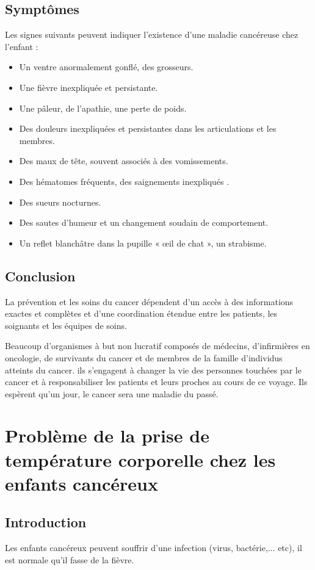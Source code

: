 \documentclass[12pt]{article}
\begin{document}
\subsection{Symptômes}
Les signes suivants peuvent indiquer l’existence d’une maladie cancéreuse chez l’enfant \cite{34}:
\begin{itemize}
	\item Un ventre anormalement gonflé, des grosseurs.  
	\item Une fièvre inexpliquée et persistante. 
	\item Une pâleur, de l’apathie, une perte de poids. 
	\item Des douleurs inexpliquées et persistantes dans les articulations et les membres.
	\item Des maux de tête, souvent associés à des vomissements. 
	\item Des hématomes fréquents, des saignements inexpliqués . 
	\item Des sueurs nocturnes. 
	\item Des sautes d’humeur et un changement soudain de comportement. 
	\item Un reflet blanchâtre dans la pupille « œil de chat », un strabisme.
\end{itemize}

\subsection{Conclusion}
La prévention et les soins du cancer dépendent d'un accès à des informations exactes et complètes et d'une coordination étendue entre les patients, les soignants et les équipes de soins.

Beaucoup d'organismes à but non lucratif composés de médecins, d'infirmières en oncologie, de survivants du cancer et de membres de la famille d'individus atteints du cancer. ils s'engagent à changer la vie des personnes touchées par le cancer et à responsabiliser les patients et leurs proches au cours de ce voyage. Ils espèrent qu'un jour, le cancer sera une maladie du passé.

\section{Problème de la prise de température corporelle chez les enfants cancéreux}
\subsection{Introduction}
Les enfants cancéreux peuvent souffrir d'une infection (virus, bactérie,... etc), il est normale qu'il fasse de la fièvre.
\end{document}
